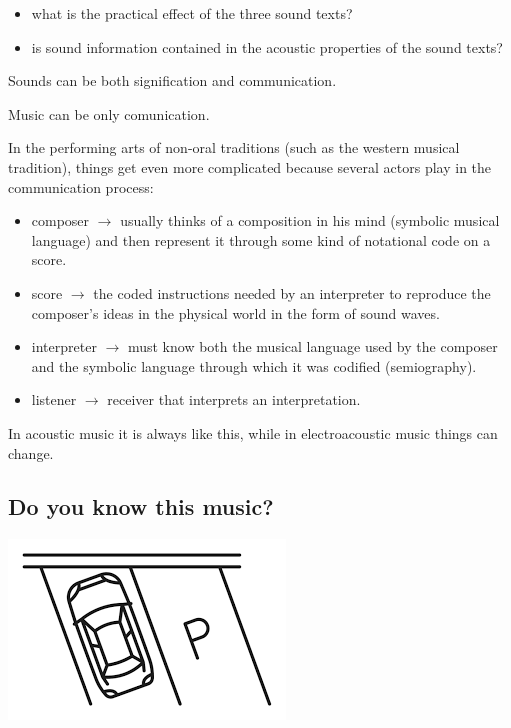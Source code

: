 \begin{itemize}
\tightlist
\item what is the practical effect of the three sound texts?
\item is sound information contained in the acoustic properties of the sound texts?
\end{itemize}

Sounds can be both signification and communication.

Music can be only comunication.

In the performing arts of non-oral traditions (such as the western musical tradition), things get even more complicated because several actors play in the communication process:

\begin{itemize}
\tightlist
\item composer \(\rightarrow\) usually thinks of a composition in his mind (symbolic musical language) and then represent it through some kind of notational code on a score.
\item score \(\rightarrow\) the coded instructions needed by an interpreter to reproduce the composer's ideas in the physical world in the form of sound waves.
\item interpreter \(\rightarrow\) must know both the musical language used by the composer and the symbolic language through which it was codified (semiography).
\item listener \(\rightarrow\) receiver that interprets an interpretation.
\end{itemize}

In acoustic music it is always like this, while in electroacoustic music things can change.

\subsection{Do you know this music? }\label{do-you-know-this-music}

\begin{center}
\includegraphics[scale=0.4]{../img/parcheggio.png}
\end{center}

